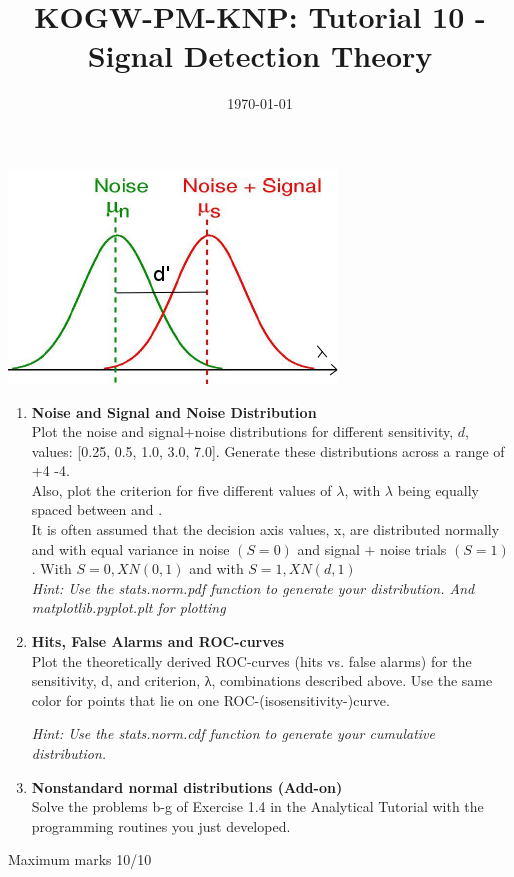 \documentclass[12pt,english]{scrartcl}
\title{KOGW-PM-KNP: Tutorial 10 - Signal Detection Theory}
\author{}
\date{\today}
\begin{document}
\maketitle

\centering
\includegraphics[scale=0.5]{SDT_fig1.png} 
\begin{enumerate}
\item \textbf{Noise and Signal and Noise Distribution} \\

Plot the noise and signal+noise distributions for different sensitivity, $d$, values: [0.25, 0.5, 1.0, 3.0, 7.0]. Generate these distributions across a range of  +4 -4. \\

Also, plot the criterion for five different values of $\lambda$, with $\lambda$ being equally spaced between and . \\

It is often assumed that the decision axis values, x, are distributed normally and with equal variance in noise $(S = 0)$ and signal $+$ noise trials $(S = 1)$. With $S = 0, X  N(0, 1)$ and with $S = 1, X  N(d,1)$ \\

\textit{Hint: Use the stats.norm.pdf function to generate your distribution. And matplotlib.pyplot.plt for plotting}

\color{black}
\item \textbf{Hits, False Alarms and ROC-curves} \\
 
Plot the theoretically derived ROC-curves (hits vs. false alarms) for the sensitivity, d, and criterion, λ, combinations described above. Use the same color for points that lie on one ROC-(isosensitivity-)curve.

\textit{Hint: Use the stats.norm.cdf function to generate your cumulative distribution.}
  
\color{black}
\item \textbf{Nonstandard normal distributions (Add-on)} \\
Solve the problems b-g of Exercise 1.4 in the Analytical Tutorial with the programming routines you just developed.
   

\end{enumerate}
 \color{black}
 Maximum marks 10/10 \\
\end{document}
